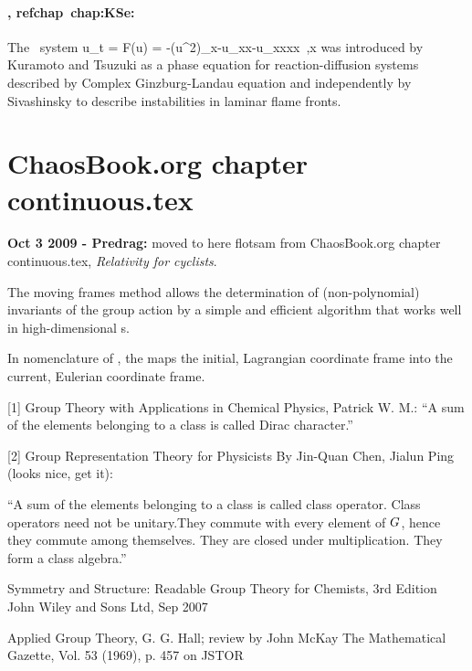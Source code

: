  \paragraph{\KS, refchap~{chap:KSe}:}
 The \KS\ system
 \beq
   u_t = F(u) = -{\textstyle{}}(u^2)_x-u_{xx}-u_{xxxx}
     \,,\qquad   x \in [-L/2,L/2]
 was introduced by
 Kuramoto and Tsuzuki as a phase equation for
 reaction-diffusion systems described by Complex Ginzburg-Landau
 equation and independently by Sivashinsky to describe
 instabilities in laminar flame fronts.





\section{ChaosBook.org chapter continuous.tex}
{\bf Oct 3 2009 - Predrag:}
moved to here flotsam from ChaosBook.org chapter continuous.tex,
{\em Relativity for cyclists}.

The moving frames method allows the determination of (non-polynomial)
invariants of the group action by a simple and efficient
algorithm that works well in high-dim\-ens\-ion\-al \statesp s.

In nomenclature of , the {\jacobianM}
maps the initial, {Lagrangian coordinate frame} into
the current, {Eulerian coordinate frame}.


[1] Group Theory with Applications in Chemical Physics, Patrick W. M.:
``A sum of the elements belonging to a class is called Dirac character.''


[2] Group Representation Theory for Physicists
 By Jin-Quan Chen, Jialun Ping (looks nice, get it):

``A sum of the elements belonging to a class is called class operator.
Class operators need not be unitary.They commute with every element of
$G$, hence they commute among themselves.
They are closed under multiplication. They form a class algebra.''

Symmetry and Structure: Readable Group Theory for Chemists, 3rd Edition
John Wiley and Sons Ltd, Sep 2007

Applied Group Theory, G. G. Hall;
review by John McKay
The Mathematical Gazette, Vol. 53 (1969), p. 457 on JSTOR


